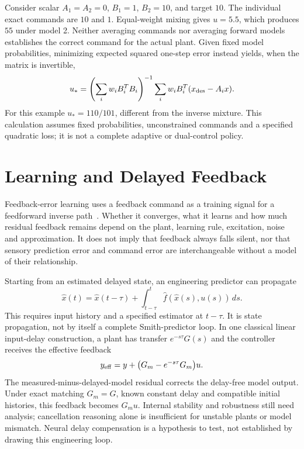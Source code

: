 Consider scalar $A_1=A_2=0$, $B_1=1$, $B_2=10$, and target $10$.
The individual exact commands are $10$ and $1$. Equal-weight mixing gives
$u=5.5$, which produces $55$ under model 2. Neither averaging commands nor
averaging forward models establishes the correct command for the actual
plant. Given fixed model probabilities, minimizing expected squared one-step
error instead yields, when the matrix is invertible,
\begin{equation}
 u_* =\left(\sum_i w_i B_i^TB_i\right)^{-1}
             \sum_i w_i B_i^T(x_{\rm des}-A_i x).
\end{equation}
For this example $u_*=110/101$, different from the inverse mixture. This
calculation assumes fixed probabilities, unconstrained commands and a
specified quadratic loss; it is not a complete adaptive or dual-control policy.

\section{Learning and Delayed Feedback}

Feedback-error learning uses a feedback command as a training signal for a
feedforward inverse path~\cite{Kawato1987}. Whether it converges, what it
learns and how much residual feedback remains depend on the plant, learning
rule, excitation, noise and approximation. It does not imply that feedback
always falls silent, nor that sensory prediction error and command error are
interchangeable without a model of their relationship.

Starting from an estimated delayed state, an engineering predictor can propagate
\begin{equation}
 \hat x(t)=\hat x(t-\tau)+\int_{t-\tau}^{t}
             \hat f(\hat x(s),u(s))\,ds.
 \label{eq:ch6:smith-predictor}
\end{equation}
This requires input history and a specified estimator at $t-\tau$.
It is state propagation, not by itself a complete Smith-predictor loop.
In one classical linear input-delay construction, a plant has transfer
$e^{-s\tau}G(s)$ and the controller receives the effective feedback
\begin{equation}
 y_{\rm eff}=y+\bigl(G_m-e^{-s\tau}G_m\bigr)u.
\end{equation}
The measured-minus-delayed-model residual corrects the delay-free model
output. Under exact matching $G_m=G$, known constant delay and compatible
initial histories, this feedback becomes $G_m u$. Internal stability and
robustness still need analysis; cancellation reasoning alone is insufficient
for unstable plants or model mismatch. Neural delay compensation is a
hypothesis to test, not established by drawing this engineering loop.

